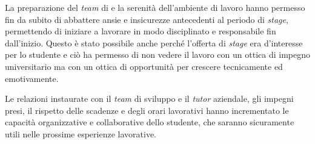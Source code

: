 La preparazione del \textit{team} di \visione{} e la serenità dell'ambiente di lavoro hanno permesso fin da subito di abbattere ansie e insicurezze antecedenti al periodo di \textit{stage}, permettendo di iniziare a lavorare in modo disciplinato e responsabile fin dall'inizio. Questo è stato possibile anche perché l'offerta di \textit{stage} era d'interesse per lo studente e ciò ha permesso di non vedere il lavoro con un ottica di impegno universitario ma con un ottica di opportunità per crescere tecnicamente ed emotivamente.

Le relazioni instaurate con il \textit{team} di sviluppo e il \textit{tutor} aziendale, gli impegni presi, il rispetto delle scadenze e degli orari lavorativi hanno incrementato le capacità organizzative e collaborative dello studente, che saranno sicuramente utili nelle prossime esperienze lavorative.